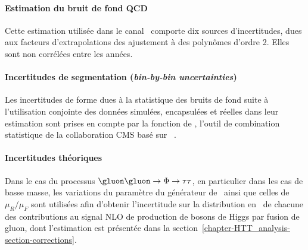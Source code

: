 \paragraph{Estimation du bruit de fond QCD}
Cette estimation utilisée dans le canal \ele\mu\ comporte dix sources d'incertitudes, dues aux facteurs d'extrapolations des ajustement à des polynômes d'ordre 2.
Elles sont non corrélées entre les années.
\paragraph{Incertitudes de segmentation (\emph{bin-by-bin uncertainties})}
Les incertitudes de forme dues à la statistique des bruits de fond suite à l'utilisation conjointe des données simulées, encapsulées et réelles dans leur estimation sont prises en compte par la fonction  de \COMBINE, l'outil de combination statistique de la collaboration CMS basé sur \ROOSTATS~\cite{RooStats}.
\paragraph{Incertitudes théoriques}
Dans le cas du processus $\gluon\gluon\to\Phi\to\tau\tau$, en particulier dans les cas de basse masse,
les variations du paramètre  du générateur de \POWHEG\ ainsi que
celles de $\mu_R/\mu_F$ sont utilisées afin d'obtenir l'incertitude sur la distribution en \pT\ de chacune des contributions
au signal NLO de production de bosons de Higgs par fusion de gluon, dont l'estimation est présentée dans la section~\ref{chapter-HTT_analysis-section-corrections}.